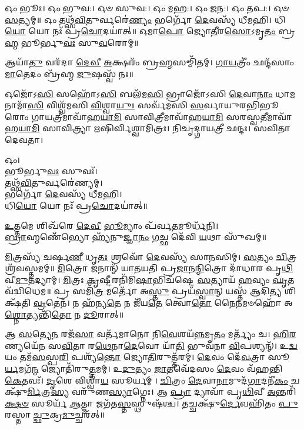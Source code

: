 𑌓𑌂 𑌭𑍂𑌃। 𑌓𑌂 𑌭𑍁𑌵:। 𑌓𑍞 𑌸𑍁𑌵:। 𑌓𑌂 𑌮𑌹:। 𑌓𑌂 𑌜𑌨:। 𑌓𑌂 𑌤𑌪:। 𑌓𑍞 \ul{𑌸}\-𑌤𑍍𑌯𑌮𑍍॥
𑌓𑌂 𑌤𑌥𑍍𑌸᳴\-\ul{𑌵𑌿}\-𑌤𑍁𑌰𑍍𑌵𑌰𑍇॑\-\ul{𑌣𑍍𑌯𑌂} 𑌭𑌰𑍍𑌗𑍋᳴ \ul{𑌦𑍇}\-𑌵𑌸𑍍𑌯᳴ 𑌧𑍀𑌮𑌹𑌿। 𑌧𑌿\-\ul{𑌯𑍋} 𑌯𑍋 𑌨𑌃᳴ 𑌪𑍍𑌰\-\ul{𑌚𑍋}\-𑌦𑌯𑌾॑𑌤𑍍॥
𑌓𑌮𑌾\-\ul{𑌪𑍋} 𑌜𑍍𑌯𑍋\-\ul{𑌤𑍀}\-𑌰\-\ul{𑌸𑍋}\-𑌽𑌮𑍃\-\ul{𑌤𑌂} 𑌬𑍍𑌰\-\ul{𑌹𑍍𑌮} 𑌭𑍂𑌰𑍍𑌭𑍁\-\ul{𑌵𑌃} 𑌸𑍁\-\ul{𑌵}\-𑌰𑍋𑌮𑍍॥


𑌆𑌯𑌾᳴\-\ul{𑌤𑍁} 𑌵𑌰᳴𑌦𑌾 \ul{𑌦𑍇}\-\-\ul{𑌵𑍀} \ul{𑌅}\-𑌕𑍍𑌷𑌰𑌂᳴ 𑌬𑍍𑌰\-\ul{𑌹𑍍𑌮}\-𑌸𑌮𑍍𑌮𑌿᳴𑌤𑌮𑍍। \ul{𑌗𑌾}\-\-\ul{𑌯}\-𑌤𑍍𑌰𑍀𑌂॑ 𑌛𑌨𑍍𑌦᳴𑌸𑌾𑌂 \ul{𑌮𑌾}\-𑌤𑍇𑌦𑌂 𑌬𑍍𑌰᳴𑌹𑍍𑌮 \ul{𑌜𑍁}\-𑌷𑌸𑍍𑌵᳴ 𑌨𑌃॥

𑌓𑌜𑍋᳴𑌽\-\ul{𑌸𑌿} 𑌸𑌹𑍋᳴𑌽\-\ul{𑌸𑌿} 𑌬𑌲᳴𑌮\-\ul{𑌸𑌿} 𑌭𑍍𑌰𑌾𑌜𑍋᳴𑌽𑌸𑌿 \ul{𑌦𑍇}\-𑌵𑌾\-\ul{𑌨𑌾𑌂} 𑌧𑌾\-\ul{𑌮} 𑌨𑌾𑌮𑌾᳴\-\ul{𑌸𑌿} 𑌵𑌿𑌶𑍍𑌵᳴𑌮𑌸𑌿 \ul{𑌵𑌿}\-𑌶𑍍𑌵𑌾\-\ul{𑌯𑍁𑌃} 𑌸𑌰𑍍𑌵᳴𑌮𑌸𑌿 \ul{𑌸}\-𑌰𑍍𑌵𑌾𑌯𑍁𑌰𑌭𑌿𑌭𑍂𑌰𑍋𑌂 𑌗𑌾𑌯𑌤𑍍𑌰𑍀𑌮𑌾𑌵𑌾᳴𑌹\-\ul{𑌯𑌾}\-\-\ul{𑌮𑌿} 𑌸𑌾𑌵𑌿𑌤𑍍𑌰𑍀𑌮𑌾𑌵𑌾᳴𑌹\-\ul{𑌯𑌾}\-\-\ul{𑌮𑌿} 𑌸𑌰𑌸𑍍𑌵𑌤𑍀𑌮𑌾𑌵𑌾᳴𑌹\-\-\ul{𑌯𑌾}\-\-\ul{𑌮𑌿} 𑌸𑌾𑌵𑌿𑌤𑍍𑌰𑍍𑌯𑌾 𑌋𑌷𑌿𑌰𑍍𑌵𑌿𑌶𑍍𑌵𑌾𑌮𑌿𑌤𑍍𑌰𑌃। 𑌨𑌿𑌚𑍃𑌦𑍍𑌗𑌾𑌯𑌤𑍍𑌰𑍀 𑌛𑌨𑍍𑌦𑌃। 𑌸𑌵𑌿𑌤𑌾 𑌦𑍇𑌵𑌤𑌾।


𑌓𑌂।\\
𑌭𑍂𑌰𑍍𑌭𑍁\-\ul{𑌵𑌃} 𑌸𑍁𑌵𑌃᳴।\\
𑌤𑌥𑍍𑌸᳴\-\ul{𑌵𑌿}\-𑌤𑍁𑌰𑍍𑌵𑌰𑍇॑𑌣𑍍𑌯𑌮𑍍।\\
𑌭𑌰𑍍𑌗𑍋᳴ \ul{𑌦𑍇}\-𑌵𑌸𑍍𑌯᳴ 𑌧𑍀𑌮𑌹𑌿।\\
𑌧𑌿\-\ul{𑌯𑍋} 𑌯𑍋 𑌨𑌃᳴ 𑌪𑍍𑌰\-\ul{𑌚𑍋}\-𑌦𑌯𑌾॑𑌤𑍍॥


\-\ul{𑌉}\-𑌤𑍍𑌤𑌮𑍇 𑌶𑌿𑌖᳴𑌰𑍇 \ul{𑌦𑍇}\-\-\ul{𑌵𑍀} \ul{𑌭𑍂}\-𑌮𑍍𑌯𑌾𑌂 𑌪᳴𑌰𑍍𑌵\-\ul{𑌤}\-𑌮𑍂𑌰𑍍𑌧᳴𑌨𑌿।\\
\-\ul{𑌬𑍍𑌰𑌾}\-𑌹𑍍𑌮𑌣𑍇᳴᳴𑌭𑍍𑌯𑍋 𑌹𑍍𑌯᳴𑌨𑍁\-\ul{𑌜𑍍𑌞𑌾}\-\-\ul{𑌨𑌂} \ul{𑌗}\-𑌚𑍍𑌛 𑌦𑍇᳴𑌵𑌿 \ul{𑌯}\-𑌥𑌾 𑌸𑍁᳴𑌖𑌮𑍍॥


\-\ul{𑌮𑌿}\-𑌤𑍍𑌰𑌸𑍍𑌯᳴ 𑌚𑌰𑍍\mbox{}𑌷\-\ul{𑌣𑍀} 𑌧𑍃\-\ul{𑌤𑌃} 𑌶𑍍𑌰𑌵𑍋᳴ \ul{𑌦𑍇}\-𑌵𑌸𑍍𑌯᳴ 𑌸𑌾\-\ul{𑌨}\-𑌸𑌿𑌮𑍍। \ul{𑌸}\-𑌤𑍍𑌯𑌂 \ul{𑌚𑌿}\-𑌤𑍍𑌰𑌶𑍍𑌰᳴𑌵𑌸𑍍𑌤𑌮𑌮𑍍॥ \ul{𑌮𑌿}\-𑌤𑍍𑌰𑍋 𑌜𑌨𑌾𑌨𑍍᳴ 𑌯𑌾𑌤𑌯𑌤𑌿 𑌪𑍍𑌰\-\ul{𑌜𑌾}\-𑌨\-\ul{𑌨𑍍𑌮𑌿}\-𑌤𑍍𑌰𑍋 𑌦𑌾᳴𑌧𑌾𑌰 𑌪𑍃\-\ul{𑌥𑌿}\-𑌵𑍀\-\ul{𑌮𑍁}\-𑌤𑌦𑍍𑌯𑌾𑌮𑍍। \ul{𑌮𑌿}\-𑌤𑍍𑌰𑌃 \ul{𑌕𑍃}\-𑌷𑍍𑌟𑍀𑌰𑌨𑌿᳴𑌮𑌿\-\ul{𑌷𑌾}\-𑌭𑌿𑌚᳴𑌷𑍍𑌟𑍇 \ul{𑌸}\-𑌤𑍍𑌯𑌾𑌯᳴ \ul{𑌹}\-𑌵𑍍𑌯𑌂 \ul{𑌘𑍃}\-𑌤𑌵᳴𑌦𑍍𑌵𑌿𑌧𑍇𑌮॥ 𑌪𑍍𑌰 𑌸𑌮𑌿᳴\-\ul{𑌤𑍍𑌰} 𑌮𑌰𑍍𑌤𑍋᳴ 𑌅\-\ul{𑌸𑍍𑌤𑍁} 𑌪𑍍𑌰𑌯᳴\-\ul{𑌸𑍍𑌵𑌾}\-𑌨𑍍 𑌯𑌸𑍍𑌤᳴ 𑌆𑌦𑌿\-\ul{𑌤𑍍𑌯} 𑌶𑌿𑌕𑍍𑌷᳴𑌤𑌿 \ul{𑌵𑍍𑌰}\-𑌤𑍇𑌨᳴। 𑌨 𑌹᳴𑌨𑍍𑌯\-\ul{𑌤𑍇} 𑌨 𑌜𑍀᳴𑌯\-\ul{𑌤𑍇} 𑌤𑍍𑌵𑍋\-\ul{𑌤𑍋} 𑌨𑍈\-\ul{𑌨}\-𑌮𑍞𑌹𑍋᳴ 𑌅\-\ul{𑌶𑍍𑌨𑍋}\-𑌤𑍍𑌯𑌨𑍍𑌤𑌿᳴\-\ul{𑌤𑍋} 𑌨 \ul{𑌦𑍂}\-𑌰𑌾𑌤𑍍॥


𑌆 \ul{𑌸}\-𑌤𑍍𑌯𑍇\-\ul{𑌨} 𑌰𑌜᳴\-\ul{𑌸𑌾} 𑌵𑌰𑍍𑌤᳴𑌮𑌾𑌨𑍋 𑌨𑌿\-\ul{𑌵𑍇}\-𑌶𑌯᳴\-\ul{𑌨𑍍𑌨}\-𑌮𑍃\-\ul{𑌤𑌂} 𑌮𑌰𑍍𑌤𑍍𑌯𑌂᳴ 𑌚। \ul{𑌹𑌿}\-\-\ul{𑌰}\-𑌣𑍍𑌯𑌯𑍇᳴𑌨 𑌸\-\ul{𑌵𑌿}\-𑌤𑌾 𑌰\-\ul{𑌥𑍇}\-𑌨𑌾\-\ul{𑌦𑍇}\-𑌵𑍋 𑌯𑌾᳴\-\ul{𑌤𑌿} 𑌭𑍁𑌵᳴𑌨𑌾 \ul{𑌵𑌿}\-𑌪𑌶𑍍𑌯𑌨𑍍᳴। 𑌉\-\ul{𑌦𑍍𑌵}\-𑌯𑌂 𑌤𑌮᳴\-\ul{𑌸}\-𑌸𑍍𑌪\-\ul{𑌰𑌿} 𑌪𑌶𑍍𑌯᳴\-\ul{𑌨𑍍𑌤𑍋} 𑌜𑍍𑌯𑍋\-\ul{𑌤𑌿}\-𑌰𑍁𑌤𑍍𑌤᳴𑌰𑌮𑍍। \ul{𑌦𑍇}\-𑌵𑌂 𑌦𑍇᳴\-\ul{𑌵}\-𑌤𑍍𑌰𑌾 𑌸𑍂\-\ul{𑌰𑍍𑌯}\-𑌮𑌗᳴\-\ul{𑌨𑍍𑌮} 𑌜𑍍𑌯𑍋𑌤𑌿᳴𑌰𑍁\-\ul{𑌤𑍍𑌤}\-𑌮𑌮𑍍। 𑌉\-\ul{𑌦𑍁}\-𑌤𑍍𑌯𑌂 \ul{𑌜𑌾}\-𑌤𑌵𑍇᳴𑌦𑌸𑌂 \ul{𑌦𑍇}\-𑌵𑌂 𑌵᳴𑌹𑌨𑍍𑌤𑌿 \ul{𑌕𑍇}\-𑌤𑌵𑌃᳴। \ul{𑌦𑍃}\-𑌶𑍇 𑌵𑌿𑌶𑍍𑌵𑌾᳴\-\ul{𑌯} 𑌸𑍂𑌰𑍍𑌯𑌮𑍍। \ul{𑌚𑌿}\-𑌤𑍍𑌰𑌂 \ul{𑌦𑍇}\-𑌵𑌾\-\ul{𑌨𑌾}\-𑌮𑍁𑌦᳴\-\ul{𑌗𑌾}\-𑌦𑌨𑍀᳴\-\ul{𑌕𑌂} 𑌚𑌕𑍍𑌷𑍁᳴\-\ul{𑌰𑍍𑌮𑌿}\-𑌤𑍍𑌰\-\ul{𑌸𑍍𑌯} 𑌵𑌰𑍁᳴𑌣\-\ul{𑌸𑍍𑌯𑌾}\-𑌗𑍍𑌨𑍇𑌃। 𑌆 \ul{𑌪𑍍𑌰𑌾} 𑌦𑍍𑌯𑌾𑌵𑌾᳴ 𑌪𑍃\-\ul{𑌥𑌿}\-𑌵𑍀 \ul{𑌅}\-𑌨𑍍𑌤𑌰𑌿᳴\-\ul{𑌕𑍍𑌷}\-\-\ul{𑍞} 𑌸𑍂𑌰𑍍𑌯᳴ \ul{𑌆}\-𑌤𑍍𑌮𑌾 𑌜𑌗᳴𑌤\-\ul{𑌸𑍍𑌤}\-𑌸𑍍𑌥𑍁𑌷᳴𑌶𑍍𑌚। 𑌤𑌚𑍍𑌚𑌕𑍍𑌷𑍁᳴\-\ul{𑌰𑍍𑌦𑍇}\-𑌵𑌹𑌿᳴𑌤𑌂 \ul{𑌪𑍁}\-𑌰𑌸𑍍𑌤𑌾\-\ul{𑌚𑍍𑌛𑍁}\-𑌕𑍍𑌰\-\ul{𑌮𑍁}\-𑌚𑍍𑌚𑌰᳴𑌤𑍍॥


